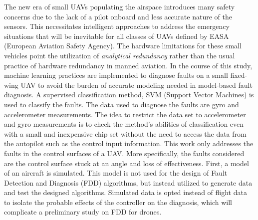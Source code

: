 % 
% 
%

The new era of small UAVs populating the airspace introduces many safety concerns due to the lack of a pilot onboard and less accurate nature of the sensors. 
This necessitates intelligent approaches to address the emergency situations that will be inevitable for all classes of UAVs defined by EASA (European Aviation Safety Agency). 
The hardware limitations for these small vehicles point the utilization of \emph{analytical redundancy} rather than the usual practice of hardware redundancy in manned aviation. 
In the course of this study, machine learning practices are implemented to diagnose faults on a small fixed-wing UAV to avoid the burden of accurate modeling needed in model-based fault diagnosis. 
A supervised classification method, SVM (Support Vector Machines) is used to classify the faults. 
The data used to diagnose the faults are gyro and accelerometer measurements. 
The idea to restrict the data set to accelerometer and gyro measurements is to check the method's abilities of classification even with a small and inexpensive chip set without the need to access the data from the autopilot such as the control input information. 
This work only addresses the faults in the control surfaces of a UAV. 
More specifically, the faults considered are the control surface stuck at an angle and loss of effectiveness. 
First, a model of an aircraft is simulated. This model is not used for the design of Fault Detection and Diagnosis (FDD) algorithms, but instead utilized to generate data and test the designed algorithms. 
Simulated data is opted instead of flight data to isolate the probable effects of the controller on the diagnosis, which will complicate a preliminary study on FDD for drones.
